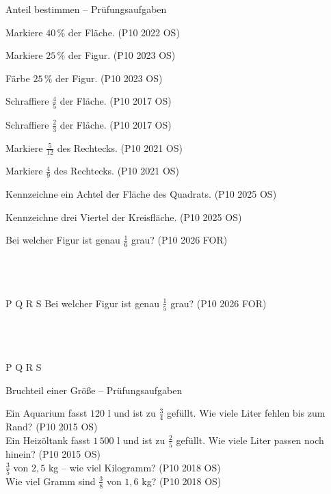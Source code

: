 \begin{aufgabe}{Anteil bestimmen – Prüfungsaufgaben}
\begin{teile}
\teil Markiere $40\,\%$ der Fläche. \hfill (P10 2022 OS)

\teil Markiere $25\,\%$ der Figur. \hfill (P10 2023 OS)

\teil Färbe $25\,\%$ der Figur. \hfill (P10 2023 OS)

\teil Schraffiere $\frac{4}{5}$ der Fläche. \hfill (P10 2017 OS)

\teil Schraffiere $\frac{2}{3}$ der Fläche. \hfill (P10 2017 OS)

\teil Markiere $\frac{5}{12}$ des Rechtecks. \hfill (P10 2021 OS)

\teil Markiere $\frac{4}{9}$ des Rechtecks. \hfill (P10 2021 OS)

\teil Kennzeichne ein Achtel der Fläche des Quadrats. \hfill (P10 2025 OS)

\teil Kennzeichne drei Viertel der Kreisfläche. \hfill (P10 2025 OS)

\kreisleer[2]
\teil Bei welcher Figur ist genau $\frac{1}{6}$ grau? \hfill (P10 2026 FOR)\\ \\ \\ \\ 

P  \quad Q  \quad R  \quad S 
\teil Bei welcher Figur ist genau $\frac{1}{5}$ grau? \hfill (P10 2026 FOR)\\ \\ \\ \\ 

P  \quad Q  \quad R  \quad S 
\end{teile}
\end{aufgabe}

\begin{aufgabe}{Bruchteil einer Größe – Prüfungsaufgaben}
\begin{teile}
\teil Ein Aquarium fasst $120$ l und ist zu $\frac{3}{4}$ gefüllt. Wie viele Liter fehlen bis zum Rand? \hfill (P10 2015 OS) \\ \leerfeld[l]
\teil Ein Heizöltank fasst $1\,500$ l und ist zu $\frac{2}{5}$ gefüllt. Wie viele Liter passen noch hinein? \hfill (P10 2015 OS) \\ \leerfeld[l]
\teil $\frac{3}{5}$ von $2{,}5$ kg – wie viel Kilogramm? \hfill (P10 2018 OS) \\ \leerfeld[kg]
\teil Wie viel Gramm sind $\frac{3}{8}$ von $1{,}6$ kg? \hfill (P10 2018 OS) \\ \leerfeld[g]
\end{teile}
\end{aufgabe}

